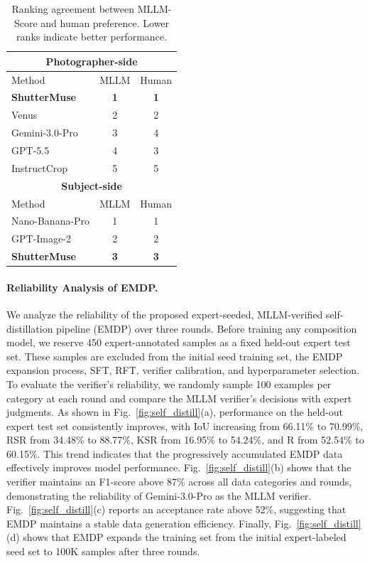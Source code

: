 \documentclass{article} %
\begin{document}
\begin{table}
\vspace{-2.0em}
\centering
\caption{
Ranking agreement between MLLM-Score and human preference. Lower ranks indicate better performance.
}
\label{tab:user_study_rankings}
\scriptsize
\setlength{\tabcolsep}{3pt}
\begin{tabular}{@{}lcc@{}}
\toprule
\multicolumn{3}{c}{\textbf{Photographer-side}} \\
\midrule
Method & MLLM & Human \\
\midrule
\rowcolor{myblue}\textbf{ShutterMuse} & \textbf{1} & \textbf{1} \\
Venus & 2 & 2 \\
Gemini-3.0-Pro & 3 & 4 \\
GPT-5.5 & 4 & 3 \\
InstructCrop & 5 & 5 \\
\midrule
\midrule
\multicolumn{3}{c}{\textbf{Subject-side}} \\
\midrule
Method & MLLM & Human \\
Nano-Banana-Pro & 1 & 1 \\
GPT-Image-2 & 2 & 2 \\
\rowcolor{myblue}\textbf{ShutterMuse} & \textbf{3} & \textbf{3} \\
\bottomrule
\end{tabular}
\end{table}
\paragraph{Reliability Analysis of EMDP.}
We analyze the reliability of the proposed expert-seeded, MLLM-verified self-distillation pipeline (EMDP) over three rounds. Before training any composition model, we reserve 450 expert-annotated
samples as a fixed held-out expert test set. These samples are excluded from the initial seed training
set, the EMDP expansion process, SFT, RFT, verifier calibration, and hyperparameter selection. To evaluate the verifier's reliability, we randomly sample 100 examples per category at each round and compare the MLLM verifier's decisions with expert judgments. As shown in Fig.~\ref{fig:self_distill}(a), performance on the held-out expert test set consistently improves, with IoU increasing from 66.11\% to 70.99\%, RSR from 34.48\% to 88.77\%, KSR from 16.95\% to 54.24\%, and R from 52.54\% to 60.15\%. This trend indicates that the progressively accumulated EMDP data effectively improves model performance. 
Fig.~\ref{fig:self_distill}(b) shows that the verifier maintains an F1-score above 87\% across all data categories and rounds, demonstrating the reliability of Gemini-3.0-Pro as the MLLM verifier. Fig.~\ref{fig:self_distill}(c) reports an acceptance rate above 52\%, suggesting that EMDP maintains a stable data generation efficiency. Finally, Fig.~\ref{fig:self_distill}(d) shows that EMDP expands the training set from the initial expert-labeled seed set to 100K samples after three rounds.
\end{document}
